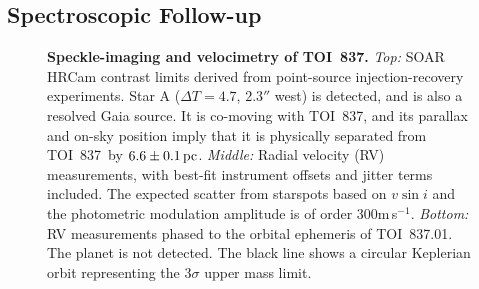 \documentclass[12pt,twocolumn,tighten]{aastex63}
\newcommand{\tn}{TOI~837} %
\newcommand{\pn}{TOI~837.01} %
\begin{document}
\subsection{Spectroscopic Follow-up}
\label{subsec:spectra}

\begin{figure}[!t]
	\begin{center}
		\leavevmode
		
		\vspace{-0.3cm}
	\end{center}
	\vspace{-0.6cm}
	\caption{
    {\bf Speckle-imaging and velocimetry of \tn.} {\it Top:}
    SOAR HRCam contrast limits derived from point-source
    injection-recovery experiments. Star A ($\Delta T=4.7$, $2.3''$
    west) is detected, and is also a
    resolved Gaia source.  It is co-moving with \tn, and its parallax
    and on-sky position imply that it is physically separated from
    \tn\ by $6.6\pm 0.1\,{\rm pc}$.  {\it Middle:} Radial velocity
    (RV) measurements, with best-fit instrument offsets and jitter
    terms included.  The expected scatter from starspots based on
    $v\sin i$ and the photometric modulation amplitude is of order
    300m$\,$s$^{-1}$.  {\it Bottom:} RV measurements phased to the
    orbital ephemeris of \pn.  The planet is not detected.  The black
    line shows a circular Keplerian orbit representing the $3\sigma$
    upper mass limit.
		\label{fig:followup}
	}
\end{figure}
\end{document}
